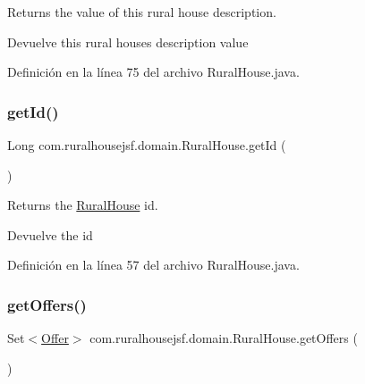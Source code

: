 Returns the value of this rural house description.

\begin{DoxyReturn}{Devuelve}
this rural houses description value 
\end{DoxyReturn}


Definición en la línea 75 del archivo Rural\+House.\+java.

\mbox{\label{classcom_1_1ruralhousejsf_1_1domain_1_1_rural_house_adae53723eac123b55f8122e89cdfe9c3}} 
\subsubsection{\texorpdfstring{getId()}{getId()}}
{\footnotesize\ttfamily Long com.\+ruralhousejsf.\+domain.\+Rural\+House.\+get\+Id (\begin{DoxyParamCaption}{ }\end{DoxyParamCaption})}

Returns the \mbox{\hyperlink{classcom_1_1ruralhousejsf_1_1domain_1_1_rural_house}{Rural\+House}} id.

\begin{DoxyReturn}{Devuelve}
the id 
\end{DoxyReturn}


Definición en la línea 57 del archivo Rural\+House.\+java.

\mbox{\label{classcom_1_1ruralhousejsf_1_1domain_1_1_rural_house_a8e5bd3ba4e562e0c1e57e762cdee9447}} 
\subsubsection{\texorpdfstring{getOffers()}{getOffers()}}
{\footnotesize\ttfamily Set$<$\mbox{\hyperlink{classcom_1_1ruralhousejsf_1_1domain_1_1_offer}{Offer}}$>$ com.\+ruralhousejsf.\+domain.\+Rural\+House.\+get\+Offers (\begin{DoxyParamCaption}{ }\end{DoxyParamCaption})}

